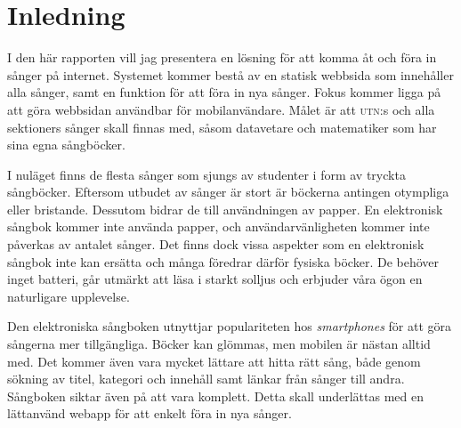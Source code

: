 \section{Inledning}

I den här rapporten vill jag presentera en lösning för att komma åt och föra in sånger på internet. Systemet kommer bestå av en statisk webbsida som innehåller alla sånger, samt en funktion för att föra in nya sånger. Fokus kommer ligga på att göra webbsidan användbar för mobilanvändare. Målet är att \textsc{utn}:s och alla sektioners sånger skall finnas med, såsom datavetare och matematiker som har sina egna sångböcker. 

I nuläget finns de flesta sånger som sjungs av studenter i form av tryckta sångböcker. Eftersom utbudet av sånger är stort är böckerna antingen otympliga eller bristande. Dessutom bidrar de till användningen av papper. En elektronisk sångbok kommer inte använda papper, och användarvänligheten kommer inte påverkas av antalet sånger. Det finns dock vissa aspekter som en elektronisk sångbok inte kan ersätta och många föredrar därför fysiska böcker. De behöver inget batteri, går utmärkt att läsa i starkt solljus och erbjuder våra ögon en naturligare upplevelse.

Den elektroniska sångboken utnyttjar populariteten hos \emph{smartphones} för att göra sångerna mer tillgängliga. Böcker kan glömmas, men mobilen är nästan alltid med. Det kommer även vara mycket lättare att hitta rätt sång, både genom sökning av titel, kategori och innehåll samt länkar från sånger till andra. Sångboken siktar även på att vara komplett. Detta skall underlättas med en lättanvänd webapp för att enkelt föra in nya sånger.